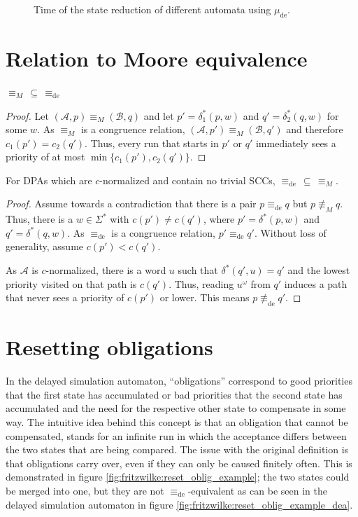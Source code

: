 \begin{figure}
\begin{minipage}{0.49\textwidth}
		\caption{Time of the state reduction of different automata using $\mu_\text{de}$.}
		\label{fig:fritzwilke:empirical_runtime}
	\end{minipage}
\end{figure}



\section{Relation to Moore equivalence}
\begin{lem}
	$\equiv_M \,\subseteq\, \equiv_\text{de}$
\end{lem}

\begin{proof}
	Let $(\mathcal{A}, p) \equiv_M (\mathcal{B}, q)$ and let $p' = \delta_1^*(p, w)$ and $q' = \delta_2^*(q, w)$ for some $w$. As $\equiv_M$ is a congruence relation, $(\mathcal{A}, p') \equiv_M (\mathcal{B}, q')$ and therefore $c_1(p') = c_2(q')$. Thus, every run that starts in $p'$ or $q'$ immediately sees a priority of at most $\min \{c_1(p'), c_2(q')\}$.
\end{proof}


\begin{lem}
	For DPAs which are $c$-normalized and contain no trivial SCCs, $\equiv_\text{de} \,\subseteq\, \equiv_M$.
\end{lem}

\begin{proof}
	Assume towards a contradiction that there is a pair $p \equiv_\text{de} q$ but $p \not\equiv_M q$. Thus, there is a $w \in \Sigma^*$ with $c(p') \neq c(q')$, where $p' = \delta^*(p, w)$ and $q' = \delta^*(q, w)$. As $\equiv_\text{de}$ is a congruence relation, $p' \equiv_\text{de} q'$. Without loss of generality, assume $c(p') < c(q')$.
	
	As $\mathcal{A}$ is $c$-normalized, there is a word $u$ such that $\delta^*(q', u) = q'$ and the lowest priority visited on that path is $c(q')$. Thus, reading $u^\omega$ from $q'$ induces a path that never sees a priority of $c(p')$ or lower. This means $p \not\equiv_\text{de} q'$.
\end{proof}


\section{Resetting obligations} 
In the delayed simulation automaton, \enquote{obligations} correspond to good priorities that the first state has accumulated or bad priorities that the second state has accumulated and the need for the respective other state to compensate in some way. The intuitive idea behind this concept is that an obligation that cannot be compensated, stands for an infinite run in which the acceptance differs between the two states that are being compared. The issue with the original definition is that obligations carry over, even if they can only be caused finitely often. This is demonstrated in figure \ref{fig:fritzwilke:reset_oblig_example}; the two states could be merged into one, but they are not $\equiv_\text{de}$-equivalent as can be seen in the delayed simulation automaton in figure \ref{fig:fritzwilke:reset_oblig_example_dea}.

